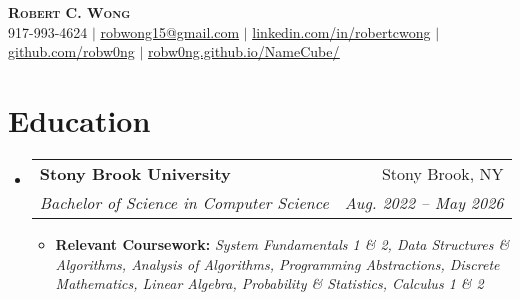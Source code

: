 \documentclass[letterpaper,11pt]{article}
\makeatletter
\newcommand{\resumeSubheading}[4]{
  \vspace{-2pt}\item
    \begin{tabular*}{0.97\textwidth}[t]{l@{\extracolsep{\fill}}r}
      \textbf{#1} & #2 \\
      \textit{\small#3} & \textit{\small #4} \\
    \end{tabular*}\vspace{-7pt}
}
\newcommand{\resumeSubHeadingListStart}{\begin{itemize}[leftmargin=0.15in, label={}]}
\newcommand{\resumeSubHeadingListEnd}{\end{itemize}}
\makeatother
\begin{document}

\begin{center}
    \textbf{\Huge \scshape Robert C. Wong} \\ \vspace{1pt}
    \small 917-993-4624 $|$ \href{mailto:robwon15@gmail.com}{\underline{robwong15@gmail.com}} $|$ 
    \href{https://linkedin.com/in/robertcwong}{\underline{linkedin.com/in/robertcwong}} $|$
    \href{https://github.com/robw0ng/}{\underline{github.com/robw0ng}} $|$
    \href{https://robw0ng.github.io/NameCube/}{\underline{robw0ng.github.io/NameCube/}}

\end{center}



\section{Education}
  \resumeSubHeadingListStart
    \resumeSubheading
      {Stony Brook University}{Stony Brook, NY}
      {Bachelor of Science in Computer Science}{Aug. 2022 -- May 2026}
      \begin{itemize}[leftmargin=0.15in, label={}, itemsep=10pt, topsep=5pt, parsep=0pt, partopsep=0pt]
      \item \small{\textbf{Relevant Coursework:} \textit{System Fundamentals 1 \& 2, Data Structures \& Algorithms, Analysis of Algorithms, Programming Abstractions, Discrete Mathematics, Linear Algebra, Probability \& Statistics, Calculus 1 \& 2}}
      \end{itemize}
  \resumeSubHeadingListEnd
\vspace{-12pt}
\end{document}
